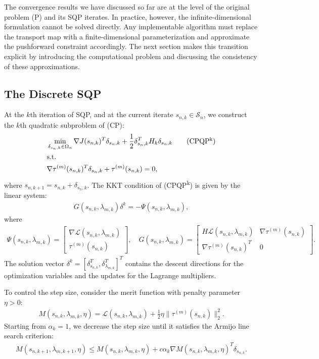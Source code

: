 \documentclass[12pt,leqno]{amsart}
\begin{document}
The convergence results we have discussed so far are at the level of the original problem (P) and its SQP iterates. In practice, however, the infinite-dimensional formulation cannot be solved directly. Any implementable algorithm must replace the transport map with a finite-dimensional parameterization and approximate the pushforward constraint accordingly. The next section makes this transition explicit by introducing the computational problem and discussing the consistency of these approximations.

\subsection{The Discrete SQP}\label{subsec:discr-SQP}

At the $k$th iteration of SQP, and at the current iterate $s_{n,k} \in \mathcal{S}_n$, we construct the $k$th quadratic subproblem of (CP):
\begin{align*}
    &\min_{\delta_{s_n,k}\in\Omega_n} \nabla J(s_{n,k})^T\delta_{s_n,k} + \frac{1}{2}\delta_{s_n,k}^T H_k \delta_{s_n,k} \tag{CPQP\textsuperscript{k}}\\
    &\text{s.t.} \\
    & \nabla \tau^{(m)}(s_{n,k})^T \delta_{s_n,k} + \tau^{(m)}(s_{n,k}) = 0,
\end{align*}
where $s_{n,k+1} = s_{n,k} + \delta_{s_n,k}$. The KKT condition of (CPQP\textsuperscript{k}) is given by the linear system:
\begin{align*}
    G(s_{n,k}, \lambda_{m,k})\delta^k = -\Psi(s_{n,k}, \lambda_{m,k}),
\end{align*}
where
\begin{align*}
\Psi(s_{n,k}, \lambda_{m,k}) = 
\begin{bmatrix}
\nabla \mathcal{L}(s_{n,k}, \lambda_{m,k}) \\
\tau^{(m)}(s_{n,k})
\end{bmatrix}, \quad
G(s_{n,k}, \lambda_{m,k}) = 
\begin{bmatrix}
H\mathcal{L}(s_{n,k}, \lambda_{m,k}) & \nabla \tau^{(m)}(s_{n,k}) \\
\nabla \tau^{(m)}(s_{n,k})^T & 0
\end{bmatrix}.
\end{align*}
The solution vector $\delta^k = [\delta_{s_{n,k}}^T, \delta_{\lambda_{m,k}}^T]^T$ contains the descent directions for the optimization variables and the updates for the Lagrange multipliers.

To control the step size, consider the merit function with penalty parameter $\eta > 0$:
\begin{align*}
    M(s_{n,k}, \lambda_{m,k}, \eta) = \mathcal{L}(s_{n,k}, \lambda_{m,k}) + \frac{1}{2}\eta\|\tau^{(m)}(s_{n,k})\|^2_2.
\end{align*}
Starting from $\alpha_k = 1$, we decrease the step size until it satisfies the Armijo line search criterion:
\begin{align*}
    M(s_{n,k+1}, \lambda_{m,k+1}, \eta) \leq M(s_{n,k}, \lambda_{m,k}, \eta) + c\alpha_k \nabla M(s_{n,k}, \lambda_{m,k}, \eta)^T \delta_{s_{n,k}}.
\end{align*}
\end{document}
